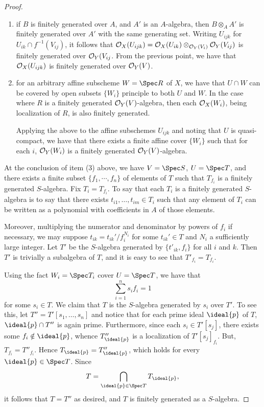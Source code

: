 \begin{proof}
\begin{enumerate}
\item if $B$ is finitely generated over $A$, and $A'$ is an 
$A$-algebra, then $B \otimes_A A'$ is finitely generated over
$A'$ with the same generating set. Writing $U_{ijk}$ for $U_{ik} 
\cap f^{-1}(V_{ij})$, it follows that $\mathcal{O}_X(U_{ijk}) = \mathcal{O}_X(U_{ik})
\otimes_{\mathcal{O}_Y(V_i)} \mathcal{O}_Y(V_{ij})$ is finitely generated over
$\mathcal{O}_Y(V_{ij}$. From the previous point, we have that
$\mathcal{O}_X(U_{ijk})$ is finitely generated over $\mathcal{O}_Y(V)$.

\item for an arbitrary affine subscheme $W = \Spec R$ of $X$, we 
have that $U \cap W$ can be covered by open subsets $\{W_i\}$ 
principle to both $U$ and $W$. In the case where $R$ is a finitely
generated $\mathcal{O}_Y(V)$-algebra, then each $\mathcal{O}_X(W_i)$, being 
localization of $R$, is also finitely generated. 

Applying the above to the affine subschemes $U_{ijk}$ and noting
that $U$ is quasi-compact, we have that there exists a finite
affine cover $\{W_i\}$ such that for each $i$, $\mathcal{O}_Y(W_i)$ is a
finitely generated $\mathcal{O}_Y(V)$-algebra.
\end{enumerate}

At the conclusion of item (3) above, we have $V = \Spec S$,
$U = \Spec T$, and there exists a finite subset $\{f_1,
\cdots, f_n\}$ of elements of $T$ such that $T_{f_i}$ is a
finitely generated $S$-algebra. Fix $T_i = T_{f_i}$. To say
that each $T_i$ is a finitely generated $S$-algebra is to say that
there exists $t_{i1},\dots,t_{im} \in T_i$ such that any element 
of $T_i$ can be written as a polynomial with coefficients in $A$ 
of those elements. 

Moreover, multiplying the numerator and denominator by powers of 
$f_i$ if necessary, we may suppose $t_{ik} = t_{ik}'/f_i^{N_i}$ for 
some $t_{ik}' \in T$ and $N_i$ a sufficiently large integer. Let
$T'$ be the $S$-algebra generated by $\{t'_{ik}, f_i\}$ for all 
$i$ and $k$. Then $T'$ is trivially a subalgebra of $T$, and it is 
easy to see that $T'_{f_i} = T_{f_i}$.

Using the fact $W_i = \Spec T_i$ cover $U = \Spec T$, we have that
\[
\sum_{i = 1}^n s_if_i = 1
\]
for some $s_i \in T$. We claim that $T$ is the $S$-algebra 
generated by $s_i$ over $T'$. To see this, let $T'' = T'[s_1, 
\dots,s_n]$ and notice that for each prime ideal $\ideal{p}$ of 
$T$, $\ideal{p} \cap T''$ is again prime. Furthermore, since 
each $s_i \in T'[s_j]$, there exists some $f_i \notin \ideal{p}$, 
whence $T''_{\ideal{p}}$ is a localization of $T'[s_j]_{f_i}$. 
But, $T_{f_i} = T''_{f_i}$. Hence $T_{\ideal{p}} = T''_{\ideal{p}}$,
which holds for every $\ideal{p} \in \Spec T$. Since 
\[
T = \bigcap_{\ideal{p} \in \Spec T} T_{\ideal{p}},
\] 
it follows that $T = T''$ as desired, and $T$ is finitely 
generated as a $S$-algebra.
\end{proof}

